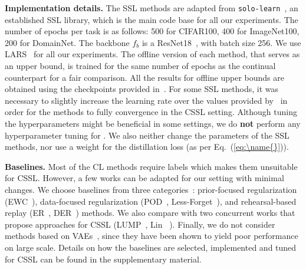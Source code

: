 \noindent\textbf{Implementation details.}
The SSL methods are adapted from \texttt{solo-learn}~\cite{turrisi2021sololearn}, an established SSL library, which is the main code base for all our experiments. 
The number of epochs per task is as follows: 500 for CIFAR100, 400 for ImageNet100, 200 for DomainNet. The backbone $f_b$ is a ResNet18~\cite{he2016deep}, with batch size 256. We use LARS~\cite{you2017large} for all our experiments. The offline version of each method, that serves as an upper bound, is trained for the same number of epochs as the continual counterpart for a fair comparison. All the results for offline upper bounds are obtained using the checkpoints provided in~\cite{turrisi2021sololearn}.  For some SSL methods, it was necessary to slightly increase the learning rate over the values provided by~\cite{turrisi2021sololearn} in order for the methods to fully convergence in the CSSL setting. Although tuning the hyperparameters might be beneficial in some settings, we do \textbf{not} perform any hyperparameter tuning for \name{}. We also neither change the parameters of the SSL methods, nor use a weight for the distillation loss (as per Eq.~(\ref{eq:\name{}})). 

\noindent\textbf{Baselines.}
Most of the CL methods require labels which makes them unsuitable for CSSL. However, a few works can be adapted for our setting with minimal changes. We choose baselines from three categories~\cite{de2019continual}: prior-focused regularization (EWC~\cite{kirkpatrick2017overcoming}), data-focused regularization (POD~\cite{douillard2020podnet}, Less-Forget~\cite{hou2019learning}), and rehearsal-based replay (ER~\cite{Robins95}, DER~\cite{buzzega2020dark}) methods. We also compare with two concurrent works that propose approaches for CSSL (LUMP~\cite{madaan2021rethinking}, Lin \etal~\cite{lin2021continual}). Finally, we do not consider methods based on VAEs~\cite{rao2019continual, achille2018life}, since they have been shown to yield poor performance on large scale. Details on how the baselines are selected, implemented and tuned for CSSL can be found in the supplementary material.%

